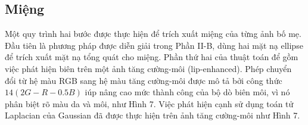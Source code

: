 \documentclass[journal]{IEEEtran}
\begin{document}
\subsection{Miệng}
Một quy trình hai bước được thực hiện để trích xuất miệng của từng ảnh bố mẹ. Đầu tiên là phương pháp được diễn giải trong Phần II-B, dùng hai mặt nạ ellipse để trích xuất mặt nạ tổng quát cho miệng. Phần thứ hai của thuật toán để gồm việc phát hiện biên trên một ảnh tăng cường-môi (lip-enhanced). Phép chuyển đổi từ hệ màu RGB sang hệ màu tăng cường-môi được mô tả bởi công thức $14(2G-R-0.5B)$ iúp nâng cao mức thành công của bộ dò biên môi, vì nó phân biệt rõ màu da và môi, như Hình 7. Việc phát hiện cạnh sử dụng toán tử Laplacian của Gaussian đã được thực hiện trên ảnh tăng cường-môi như Hình 7.
\begin{figure}[!h]
\centering
{}

\end{figure}
\end{document}
